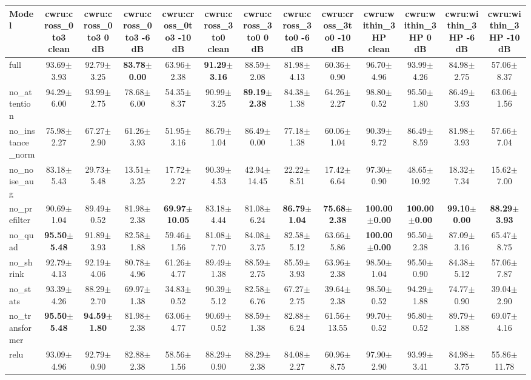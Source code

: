 \begin{tabular}{lcccccccccccc}
\toprule
Model & cwru:cross\_0to3 clean & cwru:cross\_0to3 0 dB & cwru:cross\_0to3 -6 dB & cwru:cross\_0to3 -10 dB & cwru:cross\_3to0 clean & cwru:cross\_3to0 0 dB & cwru:cross\_3to0 -6 dB & cwru:cross\_3to0 -10 dB & cwru:within\_3HP clean & cwru:within\_3HP 0 dB & cwru:within\_3HP -6 dB & cwru:within\_3HP -10 dB \\
\midrule
full & 93.69$\pm$3.93 & 92.79$\pm$3.25 & \textbf{83.78$\pm$0.00} & 63.96$\pm$2.38 & \textbf{91.29$\pm$3.16} & 88.59$\pm$2.08 & 81.98$\pm$4.13 & 60.36$\pm$0.90 & 96.70$\pm$4.96 & 93.99$\pm$4.26 & 84.98$\pm$2.75 & 57.06$\pm$8.37 \\
no\_attention & 94.29$\pm$6.00 & 93.99$\pm$2.75 & 78.68$\pm$6.00 & 54.35$\pm$8.37 & 90.99$\pm$3.25 & \textbf{89.19$\pm$2.38} & 84.38$\pm$1.38 & 64.26$\pm$2.27 & 98.80$\pm$0.52 & 95.50$\pm$1.80 & 86.49$\pm$3.93 & 63.06$\pm$1.56 \\
no\_instance\_norm & 75.98$\pm$2.27 & 67.27$\pm$2.90 & 61.26$\pm$3.93 & 51.95$\pm$3.16 & 86.79$\pm$1.04 & 86.49$\pm$0.00 & 77.18$\pm$1.38 & 60.06$\pm$1.04 & 90.39$\pm$9.72 & 86.49$\pm$8.59 & 81.98$\pm$3.93 & 57.66$\pm$7.04 \\
no\_noise\_aug & 83.18$\pm$5.43 & 29.73$\pm$5.48 & 13.51$\pm$3.25 & 17.72$\pm$2.27 & 90.39$\pm$4.53 & 42.94$\pm$14.45 & 22.22$\pm$8.51 & 17.42$\pm$6.64 & 97.30$\pm$0.90 & 48.65$\pm$10.92 & 18.32$\pm$7.34 & 15.62$\pm$7.00 \\
no\_prefilter & 90.69$\pm$1.04 & 89.49$\pm$0.52 & 81.98$\pm$2.38 & \textbf{69.97$\pm$10.05} & 83.18$\pm$4.44 & 81.08$\pm$6.24 & \textbf{86.79$\pm$1.04} & \textbf{75.68$\pm$2.38} & \textbf{100.00$\pm$0.00} & \textbf{100.00$\pm$0.00} & \textbf{99.10$\pm$0.00} & \textbf{88.29$\pm$3.93} \\
no\_quad & \textbf{95.50$\pm$5.48} & 91.89$\pm$3.93 & 82.58$\pm$1.88 & 59.46$\pm$1.56 & 81.08$\pm$7.70 & 84.08$\pm$3.75 & 82.58$\pm$5.12 & 63.66$\pm$5.86 & \textbf{100.00$\pm$0.00} & 95.50$\pm$2.38 & 87.09$\pm$3.16 & 65.47$\pm$8.75 \\
no\_shrink & 92.79$\pm$4.13 & 92.19$\pm$4.06 & 80.78$\pm$4.96 & 61.26$\pm$4.77 & 89.49$\pm$1.38 & 88.59$\pm$2.75 & 85.59$\pm$3.93 & 63.96$\pm$2.38 & 98.50$\pm$1.04 & 95.50$\pm$0.90 & 84.38$\pm$5.12 & 57.06$\pm$7.87 \\
no\_stats & 93.39$\pm$4.26 & 88.29$\pm$2.70 & 69.97$\pm$1.38 & 34.83$\pm$0.52 & 90.39$\pm$5.12 & 82.58$\pm$6.76 & 67.27$\pm$2.75 & 39.64$\pm$2.38 & 98.50$\pm$0.52 & 94.29$\pm$1.88 & 74.77$\pm$0.90 & 39.04$\pm$2.90 \\
no\_transformer & \textbf{95.50$\pm$5.48} & \textbf{94.59$\pm$1.80} & 81.98$\pm$2.38 & 63.06$\pm$4.77 & 90.69$\pm$0.52 & 88.59$\pm$1.38 & 82.88$\pm$6.24 & 61.56$\pm$13.55 & 99.70$\pm$0.52 & 95.80$\pm$0.52 & 89.79$\pm$1.88 & 69.07$\pm$4.16 \\
relu & 93.09$\pm$4.96 & 92.79$\pm$0.90 & 82.88$\pm$2.38 & 58.56$\pm$1.56 & 88.29$\pm$0.90 & 88.29$\pm$2.38 & 84.08$\pm$2.27 & 60.96$\pm$8.75 & 97.90$\pm$2.90 & 93.99$\pm$3.41 & 84.98$\pm$3.75 & 55.86$\pm$11.78 \\
\bottomrule
\end{tabular}

